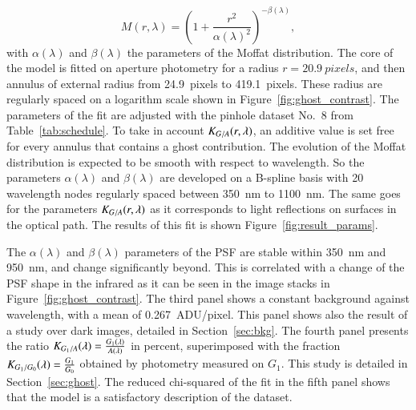 \begin{equation}
M(r, \lambda)= \left( 1+\frac{r^2}{\alpha(\lambda)^2} \right)^{-\beta(\lambda)},
\end{equation}
with $\alpha(\lambda)$ and $\beta(\lambda)$ the parameters of the Moffat distribution.
The core of the model is fitted on aperture photometry for a radius $r=\SI{20.9}{pixels}$, and then annulus of external radius from \SI{24.9}{pixels} to \SI{419.1}{pixels}. These radius are regularly spaced on a logarithm scale shown in Figure~\ref{fig:ghost_contrast}. The parameters of the fit are adjusted with the \spinhole pinhole dataset No.~8 from Table~\ref{tab:schedule}. To take in account $K_{G/A}(r, \lambda)$, an additive value is set free for every annulus that contains a ghost contribution. The evolution of the Moffat distribution is expected to be smooth with respect to wavelength. So the parameters $\alpha(\lambda)$ and $\beta(\lambda)$ are developed on a B-spline basis with 20 wavelength nodes regularly spaced between \SI{350}{\nano\meter} to \SI{1100}{\nano\meter}. The same goes for the parameters $K_{G/A}(r, \lambda)$ as it corresponds to light reflections on surfaces in the optical path. The results of this fit is shown Figure~\ref{fig:result_params}. 

The $\alpha(\lambda)$ and $\beta(\lambda)$ parameters of the PSF are stable within \SI{350}{\nano\meter} and \SI{950}{\nano\meter}, and change significantly beyond. This is correlated with a change of the PSF shape in the infrared as it can be seen in the image stacks in Figure~\ref{fig:ghost_contrast}. The third panel shows a constant background against wavelength, with a mean of \SI{0.267}{ADU/pixel}. This panel shows also the result of a study over dark images, detailed in Section~\ref{sec:bkg}. The fourth panel presents the ratio $K_{G_1/A}(\lambda) = \frac{G_1(\lambda)}{A(\lambda)}$ in percent, superimposed with the fraction $K_{G_1/G_0}(\lambda)=\frac{G_1}{G_0}$ obtained by photometry measured on $G_1$. This study is detailed in Section~\ref{sec:ghost}. The reduced chi-squared of the fit in the fifth panel shows that the model is a satisfactory description of the dataset.

